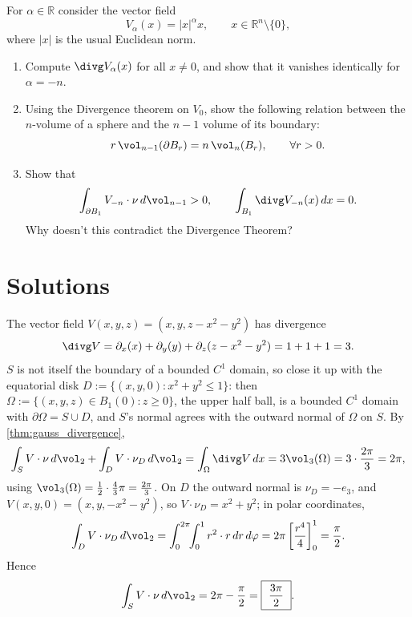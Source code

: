 \begin{exercise}
\label{ex:11.5}
For $\alpha\in\mathbb{R}$ consider the vector field
\[V_\alpha(x) = \lvert x\rvert^\alpha x, \qquad x\in\mathbb{R}^n\setminus\{0\},\]
where $\lvert x\rvert$ is the usual Euclidean norm.
\begin{enumerate}[label=\textbf{\arabic*.}]
  \item Compute $\divg V_\alpha(x)$ for all $x\neq0$, and show that it vanishes identically
  for $\alpha=-n$.
  \item Using the Divergence theorem on $V_0$, show the following relation between the
  $n$-volume of a sphere and the $n-1$ volume of its boundary:
  \[r\,\vol_{n-1}(\partial B_r) = n\,\vol_n(B_r), \qquad \forall r>0.\]
  \item Show that
  \[\int_{\partial B_1} V_{-n}\cdot\nu\,d\vol_{n-1} > 0, \qquad \int_{B_1} \divg V_{-n}(x)\,dx
    = 0.\]
  Why doesn't this contradict the Divergence Theorem?
\end{enumerate}
\end{exercise}

\section{Solutions}
\label{sec:week11_solutions}

\begin{exercisesolution}
The vector field $V(x,y,z) = (x,y,z-x^2-y^2)$ has divergence
\[\divg V = \partial_x(x) + \partial_y(y) + \partial_z(z-x^2-y^2) = 1+1+1 = 3.\]
$S$ is not itself the boundary of a bounded $C^1$ domain, so close it up with the equatorial
disk $D := \{(x,y,0) : x^2+y^2\leq1\}$: then $\Omega := \{(x,y,z)\in B_1(0) : z\geq0\}$, the
upper half ball, is a bounded $C^1$ domain with $\partial\Omega = S\cup D$, and $S$'s
 normal agrees with the outward normal of $\Omega$ on $S$. By
\cref{thm:gauss_divergence},
\[\int_S V\cdot\nu\,d\vol_2 + \int_D V\cdot\nu_D\,d\vol_2 = \int_\Omega \divg V\,dx
  = 3\vol_3(\Omega) = 3\cdot\frac{2\pi}{3} = 2\pi,\]
using $\vol_3(\Omega) = \frac12\cdot\frac43\pi = \frac{2\pi}{3}$. On $D$ the outward normal is
$\nu_D = -e_3$, and $V(x,y,0) = (x,y,-x^2-y^2)$, so $V\cdot\nu_D = x^2+y^2$; in polar
coordinates,
\[\int_D V\cdot\nu_D\,d\vol_2 = \int_0^{2\pi}\!\!\int_0^1 r^2\cdot r\,dr\,d\varphi
  = 2\pi\left[\frac{r^4}{4}\right]_0^1 = \frac{\pi}{2}.\]
Hence
\[\int_S V\cdot\nu\,d\vol_2 = 2\pi - \frac{\pi}{2} = \boxed{\ \frac{3\pi}{2}\ }.\]
\end{exercisesolution}

